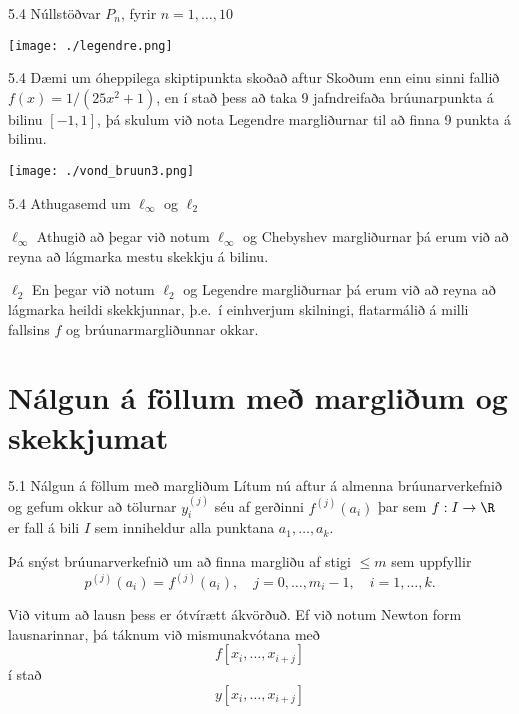   \begin{frame}{5.4 Núllstöðvar $P_n$, fyrir $n=1,\ldots,10$}
  \begin{center}
 \texttt{[image: ./legendre.png]}
\end{center}

 \end{frame}

 \begin{frame}{5.4 Dæmi um óheppilega skiptipunkta skoðað aftur}
Skoðum enn einu sinni fallið 
$f(x) = 1/(25x^2+1)$, en í stað þess að taka 9  jafndreifaða brúunarpunkta
á bilinu $[-1,1]$, þá skulum við nota Legendre margliðurnar til að finna 9
punkta á bilinu.  
\begin{center}
 \texttt{[image: ./vond\_bruun3.png]}
\end{center}

\end{frame}


\begin{frame}{5.4 Athugasemd um $\ell_\infty$ og $\ell_2$}
\begin{block}{$\ell_\infty$}
 Athugið að þegar við notum $\ell_\infty$ og Chebyshev margliðurnar þá erum við 
 að reyna að lágmarka mestu skekkju á bilinu. 
 \end{block}\pause
 
 \begin{block}{$\ell_2$}
 En þegar við notum $\ell_2$ og Legendre margliðurnar þá erum við að reyna að 
 lágmarka heildi skekkjunnar, þ.e.~í einhverjum skilningi, flatarmálið á milli 
 fallsins $f$ og brúunarmargliðunnar okkar.
 \end{block}
\end{frame}

\section*{Nálgun á föllum með margliðum og skekkjumat}

\begin{frame}{5.1  Nálgun á föllum með margliðum} 
Lítum nú aftur á almenna brúunarverkefnið og
gefum okkur að  tölurnar $y_i^{(j)}$ séu af gerðinni $f^{(j)}(a_i)$ 
þar sem $f : I \to \R$ er fall á bili $I$ sem inniheldur alla
punktana  $a_1, \ldots, a_k$.

\pause
\smallskip
Þá snýst brúunarverkefnið um að finna
margliðu  af stigi $\leq m$ sem uppfyllir
\begin{equation*}
  p^{(j)}(a_i) = f^{(j)}(a_i), \quad
  j = 0, \ldots, m_i-1, \quad i = 1, \ldots, k.
\end{equation*}

\pause
\smallskip
Við vitum að lausn þess er ótvírætt ákvörðuð.  Ef við notum Newton
form lausnarinnar, þá táknum við mismunakvótana með
$$
f[x_i,\ldots,x_{i+j}]
$$
í stað 
$$
y[x_i,\ldots,x_{i+j}]
$$
\end{frame}

